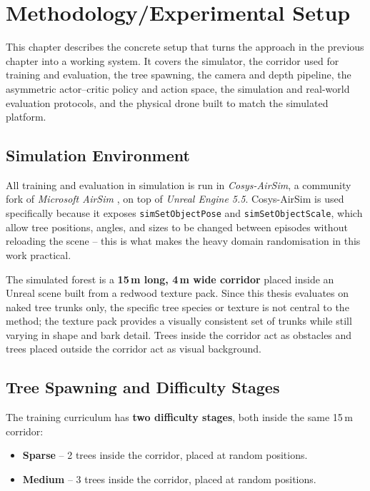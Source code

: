\documentclass[../main.tex]{subfiles}
\begin{document}
\section{Methodology/Experimental Setup}
\justify

This chapter describes the concrete setup that turns the approach in the previous chapter into a working system. It covers the simulator, the corridor used for training and evaluation, the tree spawning, the camera and depth pipeline, the asymmetric actor--critic policy and action space, the simulation and real-world evaluation protocols, and the physical drone built to match the simulated platform.

\subsection{Simulation Environment}

All training and evaluation in simulation is run in \textit{Cosys-AirSim}, a community fork of \textit{Microsoft AirSim} \cite{Kabas2022}, on top of \textit{Unreal Engine 5.5}. Cosys-AirSim is used specifically because it exposes \texttt{simSetObjectPose} and \texttt{simSetObjectScale}, which allow tree positions, angles, and sizes to be changed between episodes without reloading the scene -- this is what makes the heavy domain randomisation in this work practical.

The simulated forest is a \textbf{15\,m long, 4\,m wide corridor} placed inside an Unreal scene built from a redwood texture pack. Since this thesis evaluates on naked tree trunks only, the specific tree species or texture is not central to the method; the texture pack provides a visually consistent set of trunks while still varying in shape and bark detail. Trees inside the corridor act as obstacles and trees placed outside the corridor act as visual background.

\subsection{Tree Spawning and Difficulty Stages}

The training curriculum has \textbf{two difficulty stages}, both inside the same 15\,m corridor:

\begin{itemize}
  \item \textbf{Sparse} -- 2 trees inside the corridor, placed at random positions.
  \item \textbf{Medium} -- 3 trees inside the corridor, placed at random positions.
\end{itemize}
\end{document}
